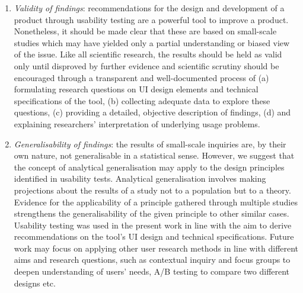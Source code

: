 \begin{enumerate}
\item \textit{Validity of findings}: recommendations for the design and development of a product through usability testing are a powerful tool to improve a product. Nonetheless, it should be made clear that these are based on small-scale studies which may have yielded only a partial understanding or biased view of the issue. Like all scientific research, the results should be held as valid only until disproved by further evidence and scientific scrutiny should be encouraged through a transparent and well-documented process of (a) formulating research questions on UI design elements and technical specifications of the tool, (b) collecting adequate data to explore these questions, (c) providing a detailed, objective description of findings, (d) and explaining researchers’ interpretation of underlying usage problems.
\item \textit{Generalisability of findings}: the results of small-scale inquiries are, by their own nature, not generalisable in a statistical sense. However, we suggest that the concept of analytical generalisation \citep{Yin2013} may apply to the design principles identified in usability tests. Analytical generalisation involves making projections about the results of a study not to a population but to a theory. Evidence for the applicability of a principle gathered through multiple studies strengthens the generalisability of the given principle to other similar cases. Usability testing was used in the present work in line with the aim to derive recommendations on the tool’s UI design and technical specifications. Future work may focus on applying other user research methods in line with different aims and research questions, such as contextual inquiry and focus groups to deepen understanding of users’ needs, A/B testing to compare two different designs etc.
\end{enumerate}
